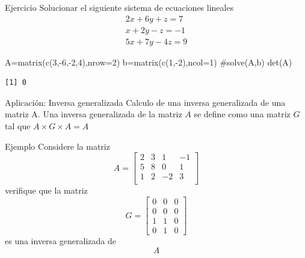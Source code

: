 \documentclass[
  ignorenonframetext,
  aspectratio=169,
  spanish,
]{beamer}
\newenvironment{Shaded}{\begin{snugshade}}{\end{snugshade}}
\newcommand{\AttributeTok}[1]{\textcolor[rgb]{0.40,0.45,0.13}{#1}}
\newcommand{\CommentTok}[1]{\textcolor[rgb]{0.37,0.37,0.37}{#1}}
\newcommand{\DecValTok}[1]{\textcolor[rgb]{0.68,0.00,0.00}{#1}}
\newcommand{\FunctionTok}[1]{\textcolor[rgb]{0.28,0.35,0.67}{#1}}
\newcommand{\NormalTok}[1]{\textcolor[rgb]{0.00,0.23,0.31}{#1}}
\newcommand{\OtherTok}[1]{\textcolor[rgb]{0.00,0.23,0.31}{#1}}
\newcommand{\SpecialCharTok}[1]{\textcolor[rgb]{0.37,0.37,0.37}{#1}}
\begin{document}
\begin{frame}[fragile]{Ejercicio}
\label{ejercicio-3}
Solucionar el siguiente sistema de ecuaciones lineales
\[\begin{array}{c}
2x+6y+z=7\\
x+2y-z=-1\\
5x+7y-4z=9
\end{array}\]

\begin{Shaded}
\begin{Highlighting}[]
\NormalTok{A}\OtherTok{=}\FunctionTok{matrix}\NormalTok{(}\FunctionTok{c}\NormalTok{(}\DecValTok{3}\NormalTok{,}\SpecialCharTok{{-}}\DecValTok{6}\NormalTok{,}\SpecialCharTok{{-}}\DecValTok{2}\NormalTok{,}\DecValTok{4}\NormalTok{),}\AttributeTok{nrow=}\DecValTok{2}\NormalTok{)}
\NormalTok{b}\OtherTok{=}\FunctionTok{matrix}\NormalTok{(}\FunctionTok{c}\NormalTok{(}\DecValTok{1}\NormalTok{,}\SpecialCharTok{{-}}\DecValTok{2}\NormalTok{),}\AttributeTok{ncol=}\DecValTok{1}\NormalTok{)}
\CommentTok{\#solve(A,b)}
\FunctionTok{det}\NormalTok{(A)}
\end{Highlighting}
\end{Shaded}

\begin{verbatim}
[1] 0
\end{verbatim}

\begin{block}{Aplicación: Inversa generalizada}
\label{aplicaciuxf3n-inversa-generalizada}
Calculo de una inversa generalizada de una matriz A. Una inversa
generalizada de la matriz \(A\) se define como una matriz \(G\) tal que
\(A\times G \times A=A\)
\end{block}
\end{frame}

\begin{frame}{Ejemplo}
\label{ejemplo}
Considere la matriz \[ A=\begin{bmatrix}
   2 & 3 & 1 & -1 \\ 
   5 & 8 & 0 & 1 \\ 
   1 & 2 & -2 & 3 \\ 
\end{bmatrix} \] verifique que la matriz \[ G=\begin{bmatrix}
0 & 0 & 0\\
0 & 0 & 0\\
1 & 1 & 0\\
0 & 1 & 0
\end{bmatrix} \] es una inversa generalizada de \[A\]
\end{frame}
\end{document}
